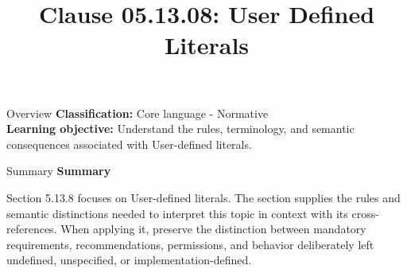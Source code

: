 \documentclass[10pt,letterpaper]{article}
\title{Clause 05.13.08: User Defined Literals}
\author{}
\date{}
\begin{document}
\maketitle
\begin{CornellOverviewBox}{Overview}
\textbf{Classification:} Core language - Normative\\[2pt]
\textbf{Learning objective:} Understand the rules, terminology, and semantic consequences associated with User-defined literals.
\end{CornellOverviewBox}\begin{CornellSummaryBox}{Summary}
{\sffamily\bfseries\color{Accent} Summary}\par\vspace{3pt}Section 5.13.8 focuses on User-defined literals. The section supplies the rules and semantic distinctions needed to interpret this topic in context with its cross-references. When applying it, preserve the distinction between mandatory requirements, recommendations, permissions, and behavior deliberately left undefined, unspecified, or implementation-defined.
\end{CornellSummaryBox}
\end{document}
